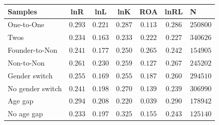\begin{tabular}{l*{5}{c}}
\hline\hline
Samples & lnR & lnL & lnK & ROA & lnRL & N \\
\hline
One-to-One & $0.293$ & $0.221$ & $0.287$ & $0.113$ & $0.286$ & $250800$ \\
Twos & $0.234$ & $0.163$ & $0.233$ & $0.222$ & $0.227$ & $340626$ \\
Founder-to-Non & $0.241$ & $0.177$ & $0.250$ & $0.265$ & $0.242$ & $154905$ \\
Non-to-Non & $0.261$ & $0.230$ & $0.259$ & $0.127$ & $0.267$ & $245202$ \\
Gender switch & $0.255$ & $0.169$ & $0.255$ & $0.187$ & $0.260$ & $294510$ \\
No gender switch & $0.241$ & $0.198$ & $0.270$ & $0.139$ & $0.239$ & $306990$ \\
Age gap & $0.294$ & $0.208$ & $0.220$ & $0.039$ & $0.290$ & $178942$ \\
No age gap & $0.233$ & $0.197$ & $0.325$ & $0.155$ & $0.243$ & $125140$ \\
\hline\hline
\end{tabular}

